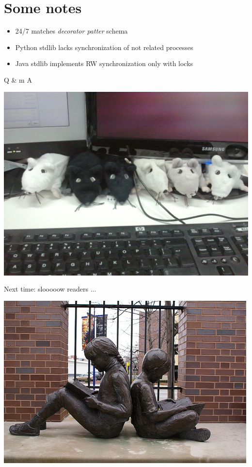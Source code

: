 \documentclass{beamer}
\begin{document}
\section{Some notes}

\begin{frame}
\begin{itemize}
 \item 24/7 matches \emph{decorator patter} schema
 \item Python stdlib lacks synchronization of not related processes
 \item Java stdlib implements RW synchronization only with locks
\end{itemize}
\end{frame}

\begin{frame}
\begin{center}
\Huge{Q \& m A}

\includegraphics[scale=0.1]{questions.jpg} 

\end{center}

\end{frame}

\begin{frame}

Next time: slooooow readers ...

\begin{center}
\includegraphics[scale=0.5]{slow_readers.jpg} 

\end{center}
\end{frame}
\end{document}
